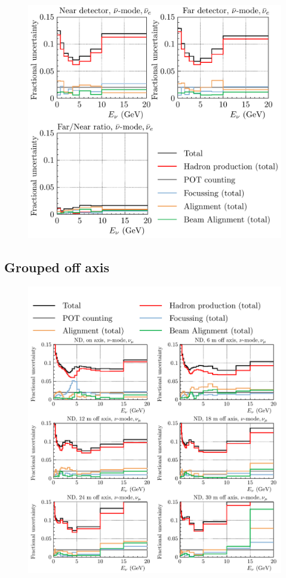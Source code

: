\documentclass{article}
\begin{document}
\begin{figure}
  \includegraphics[width=\textwidth]{plots/fracerrs/nubarmode_nuebar_ErrType}
  \caption{}
  \label{fig:grp_nubar_nuebar}
\end{figure}

\subsection{Grouped off axis}

\begin{figure}
  \includegraphics[width=\textwidth]{plots/fracerrs/numode_numu_ErrType_OffAxis}
  \caption{}
  \label{fig:grp_nu_numu_offaxis}
\end{figure}
\end{document}
